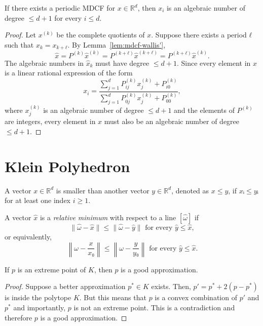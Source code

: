 \begin{theorem}
  If there exists a periodic MDCF for $x ∈ ℝ^d$,
  then $x_i$ is an algebraic number of degree $≤ d+1$ for every $i ≤ d$.
\end{theorem}

\begin{proof}
  Let $x^{(k)}$ be the complete quotients of $x$.
  Suppose there exists a period $ℓ$ such that $x_k = x_{k+ℓ}$.
  By Lemma~\ref{lem:mdcf-wallis'},
  \[
    \hat x = P^{(k)} \hat x^{(k)} = P^{(k+ℓ)} \hat x^{(k+ℓ)} = P^{(k+ℓ)} \hat x^{(k)}.
  \]
  The algebraic numbers in $\hat x_k$ must have degree $≤ d+1$.
  Since every element in $x$ is a linear rational expression of the form
  \[
    x_i = \frac{∑_{j=1}^d P_{ij}^{(k)} x_j^{(k)} + P_{i0}^{(k)}}{\sum_{j=1}^d P_{0j}^{(k)} x_j^{(k)} + P_{00}^{(k)}},
  \]
  where $x_j^{(k)}$ is an algebraic number of degree $≤ d+1$ and the elements of $P^{(k)}$ are integers,
  every element in $x$ must also be an algebraic number of degree $≤ d+1$.
\end{proof}

\section{Klein Polyhedron}

A vector $x ∈ ℝ^d$ is smaller than another vector $y ∈ ℝ^d$, denoted as $x ≤ y$, if $xᵢ ≤ yᵢ$ for at least one index $i ≥ 1$.

\begin{definition}
  A vector $\hat x$ is a \emph{relative minimum} with respect to a line $[\hat ω]$ if
  \[
    \|\hat ω - \hat x\| ≤ \|\hat ω - \hat y\| \text{ for every } \hat y ≤ \hat x,
  \]
  or equivalently,
  \[
    \left\|ω - \frac{x}{x₀} \right\| ≤ \left\|ω - \frac{y}{y₀}\right\| \text{ for every } \hat y ≤ \hat x.
  \]
\end{definition}

\begin{lemma}
  If $p$ is an extreme point of $K$, then $p$ is a good approximation.
\end{lemma}

\begin{proof}
  Suppose a better approximation $p^* ∈ K$ exists.
  Then, $p' = p^* + 2(p - p^*)$ is inside the polytope $K$.
  But this means that $p$ is a convex combination of $p'$ and $p^*$ and
  importantly, $p$ is not an extreme point.
  This is a contradiction and therefore $p$ is a good approximation.
\end{proof}

